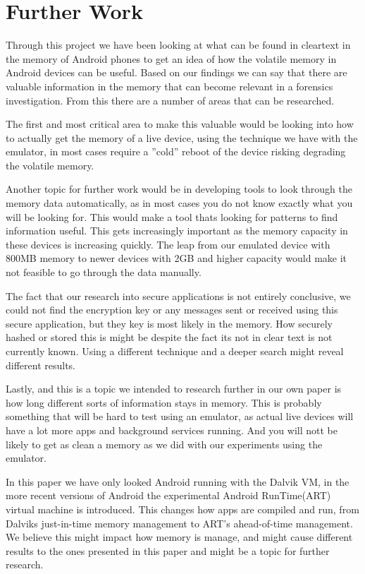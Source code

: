 \section{Further Work}
Through this project we have been looking at what can be
found in cleartext in the memory of Android phones to get
an idea of how the volatile memory in Android devices can
be useful. Based on our findings we can say that there are
valuable information in the memory that can become relevant
in a forensics investigation. From this there are a number of
areas that can be researched.

The first and most critical area to make this valuable would
be looking into how to actually get the memory of a live
device, using the technique we have with the emulator, in most
cases require a ”cold” reboot of the device risking degrading
the volatile memory.

Another topic for further work would be in developing tools
to look through the memory data automatically, as in most
cases you do not know exactly what you will be looking for.
This would make a tool thats looking for patterns to find information useful.
This gets increasingly important as the memory capacity
in these devices is increasing quickly. The leap from our
emulated device with 800MB memory to newer devices with
2GB and higher capacity would make it not feasible to go
through the data manually.

The fact that our research into secure applications is not
entirely conclusive, we could not find the encryption key or any
messages sent or received using this secure application, but
they key is most likely in the memory. How securely hashed
or stored this is might be despite the fact its not in clear text
is not currently known. Using a different technique and a deeper
search might reveal different results.

Lastly, and this is a topic we intended to research further
in our own paper is how long different sorts of information
stays in memory. This is probably something that will be hard
to test using an emulator, as actual live devices will have a lot
more apps and background services running. And you will nott be
likely to get as clean a memory as we did with our experiments
using the emulator.

In this paper we have only looked Android running with
the Dalvik VM, in the more recent versions of
Android the experimental Android RunTime(ART) virtual
machine is introduced. This changes how apps are compiled
and run, from Dalviks just-in-time memory management to
ART’s ahead-of-time management. We believe this might
impact how memory is manage, and might cause different
results to the ones presented in this paper and might be a
topic for further research.

